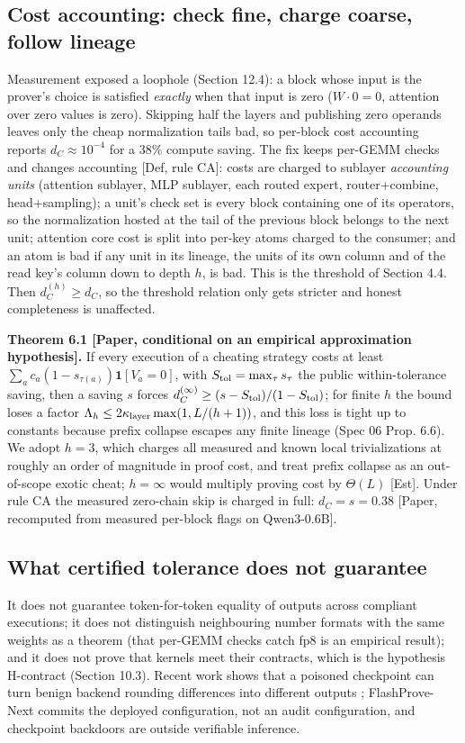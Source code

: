 \documentclass[10pt]{article}
\begin{document}
\subsection{Cost accounting: check fine, charge coarse, follow lineage}
Measurement exposed a loophole (Section 12.4): a block whose input is the prover's choice is satisfied \emph{exactly} when that input is zero ($W\cdot0=0$, attention over zero values is zero). Skipping half the layers and publishing zero operands leaves only the cheap normalization tails bad, so per-block cost accounting reports $d_C\approx10^{-4}$ for a 38\% compute saving. The fix keeps per-GEMM checks and changes accounting [Def, rule CA]: costs are charged to sublayer \emph{accounting units} (attention sublayer, MLP sublayer, each routed expert, router+combine, head+sampling); a unit's check set is every block containing one of its operators, so the normalization hosted at the tail of the previous block belongs to the next unit; attention core cost is split into per-key atoms charged to the consumer; and an atom is bad if any unit in its lineage, the units of its own column and of the read key's column down to depth $h$, is bad. This is the threshold of Section 4.4. Then $d^{(h)}_C\ge d_C$, so the threshold relation only gets stricter and honest completeness is unaffected.

\textbf{Theorem 6.1 [Paper, conditional on an empirical approximation hypothesis].} If every execution of a cheating strategy costs at least $\sum_ac_a(1-s_{\tau(a)})\mathbf 1[V_a=0]$, with $S_{\rm tol}=\max_\tau s_\tau$ the public within-tolerance saving, then a saving $s$ forces $d^{(\infty)}_C\ge(s-S_{\rm tol})/(1-S_{\rm tol})$; for finite $h$ the bound loses a factor $\Lambda_h\le2\kappa_{\rm layer}\max(1,L/(h+1))$, and this loss is tight up to constants because prefix collapse escapes any finite lineage (Spec 06 Prop. 6.6). We adopt $h=3$, which charges all measured and known local trivializations at roughly an order of magnitude in proof cost, and treat prefix collapse as an out-of-scope exotic cheat; $h=\infty$ would multiply proving cost by $\Theta(L)$ [Est]. Under rule CA the measured zero-chain skip is charged in full: $d_C=s=0.38$ [Paper, recomputed from measured per-block flags on Qwen3-0.6B].

\subsection{What certified tolerance does not guarantee}
It does not guarantee token-for-token equality of outputs across compliant executions; it does not distinguish neighbouring number formats with the same weights as a theorem (that per-GEMM checks catch fp8 is an empirical result); and it does not prove that kernels meet their contracts, which is the hypothesis H-contract (Section 10.3). Recent work shows that a poisoned checkpoint can turn benign backend rounding differences into different outputs \cite{WYL+26}; FlashProve-Next commits the deployed configuration, not an audit configuration, and checkpoint backdoors are outside verifiable inference.
\end{document}
